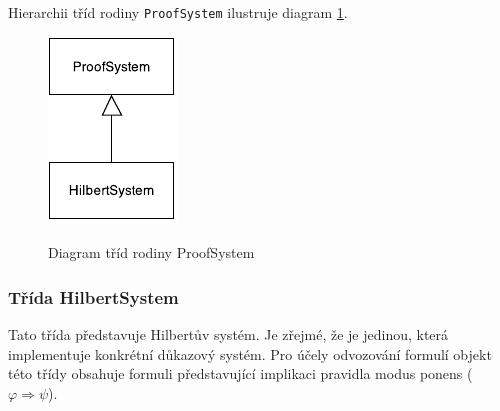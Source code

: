 \documentclass[thesis=B,czech,hidelinks]{thesis}[2012/06/26]
\begin{document}
Hierarchii tříd rodiny \texttt{ProofSystem} ilustruje diagram \ref{fig:proof_system}.

\begin{figure}
\centering
\caption{Diagram tříd rodiny ProofSystem}
\includegraphics[width=\linewidth]{diagrams/proof_system}
\label{fig:proof_system}
\end{figure}

\subsubsection{Třída HilbertSystem}

Tato třída představuje Hilbertův systém. Je zřejmé, že je jedinou, která implementuje konkrétní důkazový systém. Pro účely odvozování formulí objekt této třídy obsahuje formuli představující implikaci pravidla modus ponens ($\varphi \Rightarrow \psi$).
\end{document}
